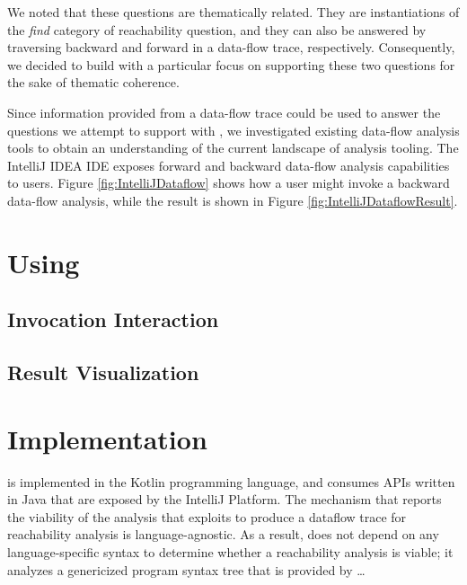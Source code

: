 \vspace{1cm}

We noted that these questions are thematically related. They are instantiations 
of the \textit{find} category of reachability question, and they can also be
answered by traversing backward and forward in a data-flow trace, respectively.
Consequently, we decided to build \toolname{} with a particular focus on
supporting these two questions for the sake of thematic coherence.

\par Since information provided from a data-flow trace could be used to answer
the questions we attempt to support with \toolname{}, we investigated existing
data-flow analysis tools to obtain an understanding of the current landscape
of analysis tooling.
The IntelliJ IDEA \ac{IDE} exposes forward and backward data-flow analysis
capabilities to users.
Figure \ref{fig:IntelliJDataflow} shows how a user might invoke a backward 
data-flow analysis, while the result is shown in
Figure \ref{fig:IntelliJDataflowResult}.


\section{Using \toolname{}}
\label{sec:UsingReachHover}

\subsection{Invocation Interaction}
\label{subsection:InvocationInteraction}


\subsection{Result Visualization}
\label{subsection:ResultVisualization}


\section{Implementation}
\label{sec:Impl}

\toolname{} is implemented in the Kotlin programming language, and consumes
\acp{API} written in Java that are exposed by the IntelliJ Platform.
The mechanism that reports the viability of the analysis that \toolname{}
exploits to produce a dataflow trace for reachability analysis is 
language-agnostic.
As a result, \toolname{} does not depend on any language-specific syntax to 
determine whether a reachability analysis is viable; it analyzes a genericized 
program syntax tree that is provided by  \dots

\endinput
